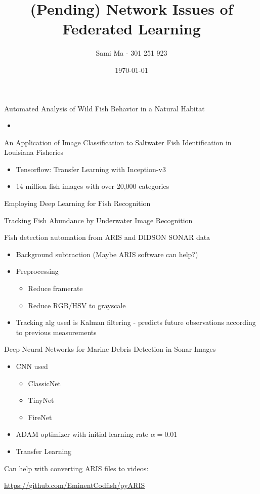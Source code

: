 \documentclass[a4paper,12pt]{article}
\begin{document}
\title{(Pending) Network Issues of Federated Learning}
\author{Sami Ma - 301 251 923}
\date{\today}
\maketitle

Automated Analysis of Wild Fish Behavior in a Natural Habitat
\cite{10.1145/2764873.2764875}

\begin{itemize}
    \item 
\end{itemize}

An Application of Image Classification to Saltwater Fish Identification in
Louisiana Fisheries \cite{10.1145/3325917.3325934}

\begin{itemize}
    \item Tensorflow: Transfer Learning with Inception-v3
    \item 14 million fish images with over 20,000 categories
\end{itemize}

Employing Deep Learning for Fish Recognition \cite{dl-fish-rec}

Tracking Fish Abundance by Underwater Image Recognition \cite{Marini2018}

Fish detection automation from ARIS and DIDSON SONAR data \cite{fish-det-sonar}

\begin{itemize}
    \item Background subtraction (Maybe ARIS software can help?)
    \item Preprocessing
        \begin{itemize}
            \item Reduce framerate
            \item Reduce RGB/HSV to grayscale
        \end{itemize}
    \item Tracking alg used is Kalman filtering - predicts future observations according to previous measurements
\end{itemize}

Deep Neural Networks for Marine Debris Detection in Sonar Images \cite{DBLP:journals/corr/abs-1905-05241}

\begin{itemize}
    \item CNN used
        \begin{itemize}
            \item ClassicNet
            \item TinyNet
            \item FireNet
        \end{itemize}
    \item ADAM optimizer with initial learning rate $\alpha = 0.01$
    \item Transfer Learning
\end{itemize}

Can help with converting ARIS files to videos:

\url{https://github.com/EminentCodfish/pyARIS}

\newpage



\end{document}
